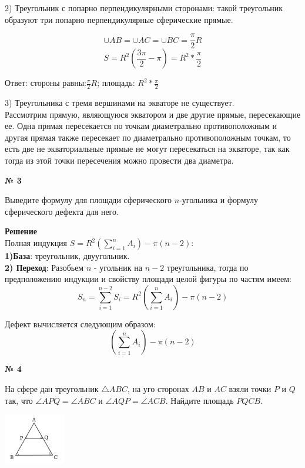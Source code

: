     2) Треугольник с попарно перпендикулярными сторонами:
    такой треугольник образуют три попарно перпендикулярные сферические прямые.

    \[
        \cup AB = \cup AC = \cup BC = \frac{\pi}{2}R
    \]
    \[
        S = R^2\left(\frac{3\pi}{2} - \pi\right) = R^2 * \frac{\pi}{2}
    \]

    Ответ: стороны равны:$\frac{\pi}{2}R$; площадь: $R^2 * \frac{\pi}{2}$

    3) Треугольника с тремя вершинами на экваторе не существует.\\
    Рассмотрим прямую, являющуюся экватором и две другие прямые, пересекающие ее.
    Одна прямая пересекается по точкам диаметрально противоположным и другая прямая также
    пересекает по диаметрально противоположным точкам, то есть две не экваториальные прямые
    не могут пересекаться на экваторе, так как тогда из этой точки пересечения можно провести два диаметра.

    \begin{center}
        \textbf{№ 3}
    \end{center}

    Выведите формулу для площади сферического $n$-угольника и формулу сферического дефекта для него.

    \textbf{Решение}\\

    Полная индукция $S = R^2\left(\displaystyle\sum_{i=1}^n A_i\right) - \pi(n - 2)$:\\

    \textbf{1)База}: треугольник, двуугольник.\\

    \textbf{2) Переход}:
    Разобьем $n$ - угольник на $n - 2$ треугольника,
    тогда по предположению индукции и свойству площади целой фигуры по частям имеем:
    \[
        S_n = \displaystyle\sum_{i=1}^{n-2} S_i = R^2\left(\displaystyle\sum_{i=1}^n A_i\right) - \pi(n - 2)
    \]

    Дефект вычисляется следующим образом:
    \[
        \left(\displaystyle\sum_{i=1}^n A_i\right) - \pi(n - 2)
    \]

    \begin{center}
        \textbf{№ 4}
    \end{center}
    На сфере дан треугольник $\triangle ABC$, на уго сторонах $AB$ и $AC$ взяли
    точки $P$ и $Q$ так, что $\angle APQ = \angle ABC$ и $\angle AQP = \angle ACB$.
    Найдите площадь $PQCB$.
    \begin{center}
        \includegraphics[width=0.2\textwidth]{images/Frame 72@2x}\\
    \end{center}

